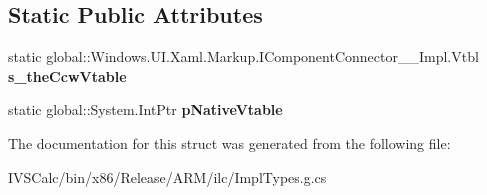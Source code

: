 \subsection*{Static Public Attributes}
\begin{DoxyCompactItemize}
\item 
\mbox{\label{struct_windows_1_1_u_i_1_1_xaml_1_1_markup_1_1_i_component_connector_____impl_1_1_vtbl_aeee57aa649f8a1e069fd42820fc06c46}} 
static global\+::\+Windows.\+U\+I.\+Xaml.\+Markup.\+I\+Component\+Connector\+\_\+\+\_\+\+Impl.\+Vtbl {\bfseries s\+\_\+the\+Ccw\+Vtable}
\item 
\mbox{\label{struct_windows_1_1_u_i_1_1_xaml_1_1_markup_1_1_i_component_connector_____impl_1_1_vtbl_a512d97de0dd7d5a44cdf1488c40cd58d}} 
static global\+::\+System.\+Int\+Ptr {\bfseries p\+Native\+Vtable}
\end{DoxyCompactItemize}


The documentation for this struct was generated from the following file\+:\begin{DoxyCompactItemize}
\item 
I\+V\+S\+Calc/bin/x86/\+Release/\+A\+R\+M/ilc/Impl\+Types.\+g.\+cs\end{DoxyCompactItemize}
